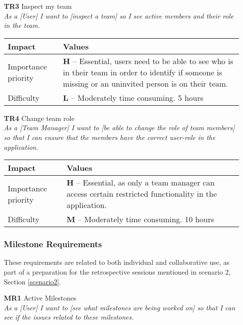 \begin{itemize}
    \item[\textbf{TR3}] Inspect my team\\
        \textit{\small{As a [User] I want to [inspect a team] so I see active members and their role in the team.}}

        \begin{tabular}{| l | p{8cm} |}
            \hline
            \rowcolor[gray]{0.8}
            \textbf{Impact} & \textbf{Values} \\
            \hline
            Importance priority & \textbf{H} -- Essential, users need to be able to see who is in their team in order to identify if someone is missing or an uninvited person is on their team.\\
            Difficulty & \textbf{L} -- Moderately time consuming. 5 hours\\
            \hline
        \end{tabular}
    \vspace{0.5cm}

    \item[\textbf{TR4}] Change team role\\
        \textit{\small{As a [Team Manager] I want to [be able to change the role of team members] so that I can ensure that the members have the correct user-role in the application.}}

        \begin{tabular}{| l | p{8cm} |}
            \hline
            \rowcolor[gray]{0.8}
            \textbf{Impact} & \textbf{Values} \\
            \hline
            Importance priority & \textbf{H} -- Essential, as only a team manager can access certain restricted functionality in the application.\\
            Difficulty & \textbf{M} -- Moderately time consuming. 10 hours\\
            \hline
        \end{tabular}
    \vspace{0.5cm}

\subsubsection{Milestone Requirements}
These requirements are related to both individual and collaborative use, as part of a preparation for the retrospective sessions mentioned in scenario 2, Section \ref{scenario2}. 
    \item[\textbf{MR1}] Active Milestones\\
        \textit{\small{As a [User] I want to [see what milestones are being worked on] so that I can see if the issues related to these milestones.}}


\end{itemize}

